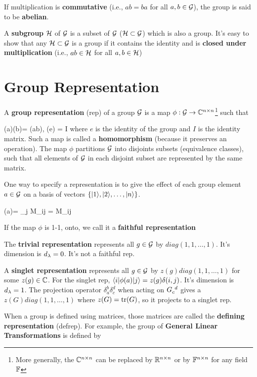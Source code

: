 If multiplication is
{\bf commutative}
(i.e., $ab=ba$ for all $a,b\in{\cal G}$),
the group is said to be {\bf abelian}.

A {\bf subgroup} ${\cal H}$ 
of ${\cal G}$
is a subset of ${\cal G}$
(${\cal H} \subset {\cal G}$)
which is also a group.
It's easy to show that any ${\cal H}\subset {\cal G}$ is a group if it
contains the identity
and is {\bf closed 
under multiplication} (i.e., $ab\in {\cal H}$ for all $a,b\in {\cal H}$) 



\section{Group  Representation}

A {\bf group representation} (rep)
of a group ${\cal G}$
is a map $\phi: {\cal G}\rightarrow { \mathbb{C}}^{n\times n}$\footnote{More generally, the ${ \mathbb{C}}^{n\times n}$ can be replaced by ${ \mathbb{R}}^{n\times n}$ or by ${ \mathbb{F}}^{n\times n}$ for any field ${ \mathbb{F}}$} such that

\beq
\phi(a)\phi(b)=
\phi(ab),
\quad \phi(e) = I
\eeq
where $e$ is the
identity of the group
and $I$ 
is the identity matrix.
Such a map is called a {\bf homomorphism}
(because it preserves an operation).
The map $\phi$ 
partitions ${\cal G}$
into disjoints subsets (equivalence classes),
such that all elements of ${\cal G}$ in each disjoint subset 
are represented by the same matrix.

One  way to specify a representation is
to give the effect of each group element $a\in {\cal G}$ on a basis of vectors $\{|1\rangle, |2\rangle, \dots, |n\rangle\}$.


\beq
\phi (a)= \sum_j M_{ij}
\implies {} = M_{ij}
\eeq

If the map $\phi$
is 1-1, onto, we call it a {\bf faithful representation} 

The {\bf trivial representation} 
represents all $g\in {\cal G}$
by  $diag(1,1, \dots, 1)$.
It's dimension is $d_\lambda=0$.
It's not a faithful rep.

A {\bf singlet representation}
represents all
$g\in {\cal G}$
by  $ z(g) diag(1,1, \dots, 1)$
for some $z(g)\in{ \mathbb{C}}$.
For the singlet rep, $\left\langle i|\phi(a)|j\right\rangle=z(g)
\delta(i,j)$.
It's dimension is $d_\lambda=1$.
The projection operator
$\delta_a^b \delta_c^d$
when acting on $G\indices{_c^d}$
gives a $ z(G) diag(1,1, \dots, 1)$
where $z(G)={\rm tr }(G)$, so it
projects to a singlet rep.



When a group is 
defined using matrices, those
matrices are called the {\bf defining representation} (defrep). For example,
the group
of {\bf General Linear Transformations}
is defined by

